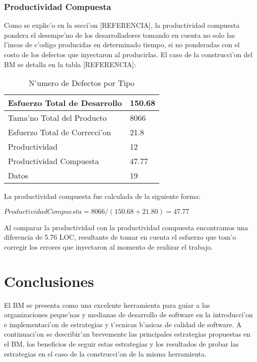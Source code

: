 \subsubsection{Productividad Compuesta}
\label{ProductividadCompuesta}
\noindent
Como se explic'o en la secci'on [REFERENCIA], la productividad compuesta pondera el desempe'no de los desarrolladores tomando en cuenta no solo las l'ineas de c'odigo producidas en determinado tiempo, si no ponderadas con el costo de los defectos que inyectaron al producirlas. El caso de la construcci'on del BM se detalla en la tabla [REFERENCIA]:

\begin{table}[htbp]
	\centering
		\begin{tabular}{| l | l |}
			\hline
			 Esfuerzo Total de Desarrollo & 150.68 \\ \hline
			 Tama'no Total del Producto & 8066 \\ \hline
			 Esfuerzo Total de Correcci'on & 21.8 \\ \hline
			 Productividad & 12 \\ \hline
			 Productividad Compuesta & 47.77 \\ \hline
			 Datos & 19 \\ \hline
		\end{tabular}
	\caption{N'umero de Defectos por Tipo}
	\label{N'umerodeDefectosporTipo}
\end{table}

La productividad compuesta fue calculada de la siguiente forma:

\begin{math}ProductividadCompuesta= 8066/(150.68+21.80) = 47.77\end{math}

Al comparar la productividad con la productividad compuesta encontramos una diferencia de 5.76 LOC, resultante de tomar en cuenta el esfuerzo que tom'o corregir los errores que inyectaron al momento de realizar el trabajo.

\section{Conclusiones}
\label{sec:Conclusiones}
\noindent
El BM se presenta como una excelente herramienta para guiar a las organizaciones peque'nas y medianas de desarrollo de software en la introducci'on e implementaci'on de estrategias y t'ecnicas b'asicas de calidad de software. A continuaci'on se describir'an brevemente las principales estrategias propuestas en el BM, los beneficios de seguir estas estrategias y los resultados de probar las estrategias en el caso de la construcci'on de la misma herramienta.


